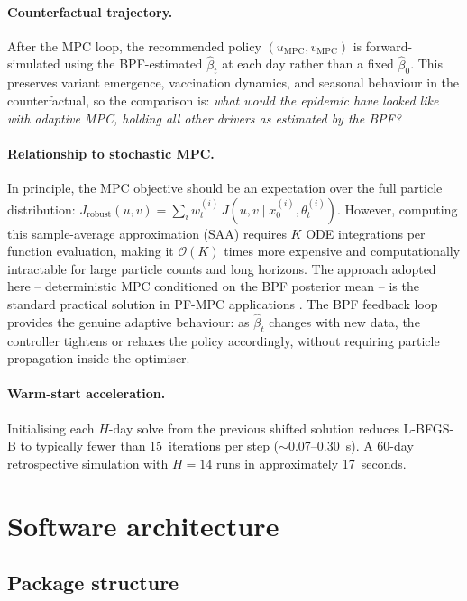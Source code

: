 \documentclass[11pt]{article}
\begin{document}
\paragraph{Counterfactual trajectory.}
After the MPC loop, the recommended policy
$(u_{\mathrm{MPC}}, v_{\mathrm{MPC}})$ is forward-simulated using the
BPF-estimated $\hat\beta_t$ at each day rather than a fixed $\hat\beta_0$.
This preserves variant emergence, vaccination dynamics, and seasonal
behaviour in the counterfactual, so the comparison is:
\emph{what would the epidemic have looked like with adaptive MPC, holding
all other drivers as estimated by the BPF?}

\paragraph{Relationship to stochastic MPC.}
In principle, the MPC objective should be an expectation over the full
particle distribution:
$J_{\mathrm{robust}}(u,v) = \sum_i w_t^{(i)}\,J(u,v\mid x_0^{(i)},
\theta_t^{(i)})$.
However, computing this sample-average approximation (SAA) requires
$K$ ODE integrations per function evaluation, making it
$\mathcal{O}(K)$ times more expensive and computationally intractable
for large particle counts and long horizons.
The approach adopted here -- deterministic MPC conditioned on the BPF
posterior mean -- is the standard practical solution in PF-MPC
applications \cite{schwarm1999}.
The BPF feedback loop provides the genuine adaptive behaviour: as
$\hat\beta_t$ changes with new data, the controller tightens or relaxes
the policy accordingly, without requiring particle propagation inside the
optimiser.

\paragraph{Warm-start acceleration.}
Initialising each $H$-day solve from the previous shifted solution
reduces L-BFGS-B to typically fewer than 15~iterations per step
($\sim$0.07--0.30~s).
A 60-day retrospective simulation with $H=14$ runs in approximately
17~seconds.


\section{Software architecture}
\label{sec:software}

\subsection{Package structure}
\end{document}
